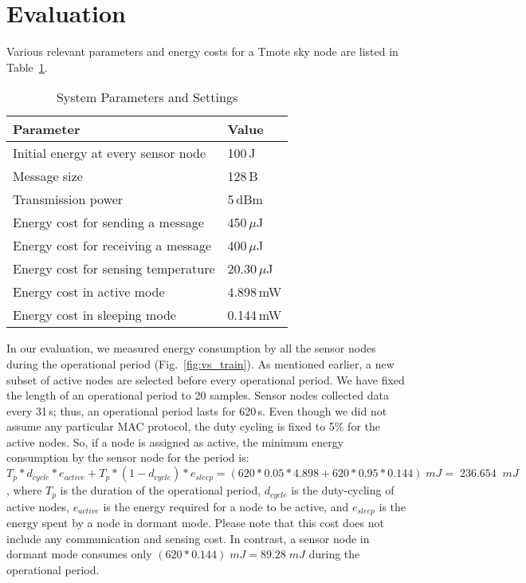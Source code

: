\documentclass[conference]{IEEEtran}
\begin{document}
\section{Evaluation}
\label{sec:eva}
Various relevant parameters and energy costs for a Tmote sky node are listed in Table~\ref{settings}.
\begin{table}
\centering
\caption{System Parameters and Settings}
\begin{tabular}{|l|l|} \hline
\textbf{Parameter} & \textbf{Value} \\ \hline
Initial energy at every sensor node & 100\,J \\ \hline
Message size & 128\,B \\ \hline
Transmission power & 5\,dBm \\ \hline
Energy cost for sending a message & 450\,$\mu$J \\ \hline
Energy cost for receiving a message & 400\,$\mu$J \\ \hline
Energy cost for sensing temperature & 20.30\,$\mu$J \\ \hline
Energy cost in active mode & 4.898\,mW \\ \hline
Energy cost in sleeping mode & 0.144\,mW \\
\hline\end{tabular}
\label{settings}
\end{table}
In our evaluation, we measured energy consumption by all the sensor nodes during the operational period (Fig.~\ref{fig:vs_train}). As mentioned earlier, a new subset of active nodes are selected before every operational period. We have fixed the length of an operational period to 20 samples. Sensor nodes collected data every 31\,s; thus, an operational period lasts for 620\,s. Even though we did not assume any particular MAC protocol, the duty cycling is fixed to 5\% for the active nodes. So, if a node is assigned as active, the minimum energy consumption by the sensor node for the period is: $T_{p}*d_{cycle}*e_{active} + T_{p}*(1-d_{cycle})*e_{sleep} = (620*0.05*4.898 + 620*0.95*0.144) \;mJ =\; 236.654 \;\;mJ$,
where $T_{p}$ is the duration of the operational period, $d_{cycle}$ is the duty-cycling of active nodes, $e_{active}$ is the energy required for a node to be active, and $e_{sleep}$ is the energy spent by a node in dormant mode. Please note that this cost does not include any communication and sensing cost. In contrast, a sensor node in dormant mode consumes only $(620*0.144) \;mJ = 89.28 \;mJ$ during the operational period.
\end{document}
